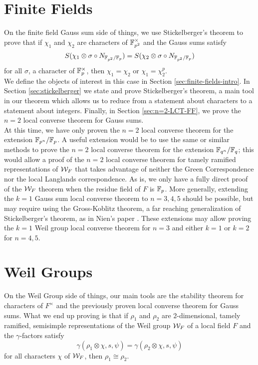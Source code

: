 \section{Finite Fields}
On the finite field Gauss sum side of things, we use Stickelberger's theorem to prove that if $\chi_1$ and $\chi_2$ are characters of $\mathbb{F}_{p^2}^\times$ and the Gauss sums satisfy
\[S(\chi_1 \otimes \sigma \circ N_{\mathbb{F}_{p^2} / \mathbb{F}_p}) = S(\chi_2 \otimes \sigma \circ N_{\mathbb{F}_{p^2} / \mathbb{F}_p})\]
for all $\sigma$, a character of $\mathbb{F}_p^\times$, then $\chi_1 = \chi_2$ or $\chi_1 = \chi_2^p$.
\\

We define the objects of interest in this case in Section \ref{sec:finite-fields-intro}.
In Section \ref{sec:stickelberger} we state and prove Stickelberger's theorem, a main tool in our theorem which allows us to reduce from a statement about characters to a statement about integers.
Finally, in Section \ref{sec:n=2-LCT-FF}, we prove the $n=2$ local converse theorem for Gauss sums.
\\

At this time, we have only proven the $n=2$ local converse theorem for the extension $\mathbb{F}_{p^n}/\mathbb{F}_{p}$.
A useful extension would be to use the same or similar methods to prove the $n=2$ local converse theorem for the extension $\mathbb{F}_{q^n}/\mathbb{F}_q$; this would allow a proof of the $n=2$ local converse theorem for tamely ramified representations of $\mathcal{W}_F$ that takes advantage of neither the Green Correspondence nor the local Langlands correspondence.
As is, we only have a fully direct proof of the $\mathcal{W}_F$ theorem when the residue field of $F$ is $\mathbb{F}_p$.
More generally, extending the $k = 1$ Gauss sum local converse theorem to $n = 3,4,5$ should be possible, but may require using the Gross-Koblitz theorem, a far reaching generalization of Stickelberger's theorem, as in Nien's paper \cite{Nien2018}.
These extensions may allow proving the $k = 1$ Weil group local converse theorem for $n = 3$ and either $k = 1$ or $k =2 $ for $n = 4,5$.
\\

\section{Weil Groups}
On the Weil Group side of things, our main tools are the stability theorem for characters of $F^\times$ and the previously proven local converse theorem for Gauss sums.
What we end up proving is that if $\rho_1$ and $\rho_2$ are $2$-dimensional, tamely ramified, semisimple representations of the Weil group $\mathcal{W}_F$ of a local field $F$ and the $\gamma$-factors satisfy
\[\gamma(\rho_1 \otimes \chi, s, \psi) = \gamma(\rho_2 \otimes \chi, s, \psi)\]
for all characters $\chi$ of $\mathcal{W}_F$, then $\rho_1 \cong \rho_2$.
\\

